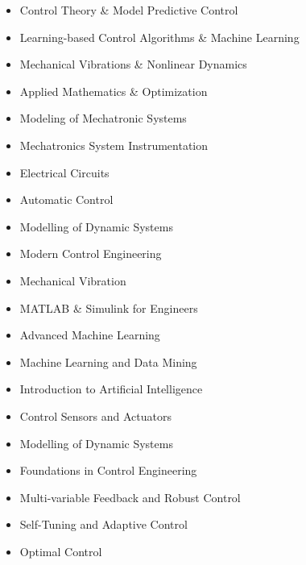 \documentclass[10pt,letterpaper,ragged2e,compact]{mocv}
\begin{document}
\begin{paracol}{2}
    \switchcolumn
    \begin{itemize}
        \item Control Theory \& Model Predictive Control
        \item Learning-based Control Algorithms \& Machine Learning
        \item Mechanical Vibrations \& Nonlinear Dynamics
        \item Applied Mathematics \& Optimization
    \end{itemize}
    \begin{itemize}
        \item Modeling of Mechatronic Systems
        \item Mechatronics System Instrumentation
        \item Electrical Circuits
        \item Automatic Control
        \item Modelling of Dynamic Systems
        \item Modern Control Engineering
        \item Mechanical Vibration
        \item MATLAB \& Simulink for Engineers
    \end{itemize}
    \begin{itemize}
        \item Advanced Machine Learning
        \item Machine Learning and Data Mining
        \item Introduction to Artificial Intelligence
        \item Control Sensors and Actuators
        \item Modelling of Dynamic Systems
        \item Foundations in Control Engineering
        \item Multi-variable Feedback and Robust Control
        \item Self-Tuning and Adaptive Control
        \item Optimal Control
    \end{itemize}
    \divider \\

\end{paracol}
\end{document}
